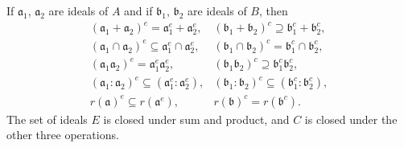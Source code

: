 \documentclass[class=book, crop=false]{standalone}
\theoremstyle{definition}
\theoremstyle{remark}
\begin{document}
\begin{exercise}\label{exc:1.18}
  If $\mathfrak{a}_{1}$, $\mathfrak{a}_{2}$ are ideals of $A$ and if
  $\mathfrak{b}_{1}$, $\mathfrak{b}_{2}$ are ideals of $B$, then
  \[
    \begin{array}{ll}
      \left(\mathfrak{a}_{1}+\mathfrak{a}_{2}\right)^{e}=\mathfrak{a}_{1}^{e}+\mathfrak{a}_{2}^{e}, & \left(\mathfrak{b}_{1}+\mathfrak{b}_{2}\right)^{c} \supseteq \mathfrak{b}_{1}^{c}+\mathfrak{b}_{2}^{c}, \\
      \left(\mathfrak{a}_{1} \cap \mathfrak{a}_{2}\right)^{e} \subseteq \mathfrak{a}_{1}^{e} \cap \mathfrak{a}_{2}^{e}, & \left(\mathfrak{b}_{1} \cap \mathfrak{b}_{2}\right)^{c}=\mathfrak{b}_{1}^{c} \cap \mathfrak{b}_{2}^{c}, \\
      \left(\mathfrak{a}_{1} \mathfrak{a}_{2}\right)^{e}=\mathfrak{a}_{1}^{e} \mathfrak{a}_{2}^{e}, & \left(\mathfrak{b}_{1} \mathfrak{b}_{2}\right)^{c} \supseteq \mathfrak{b}_{1}^{c} \mathfrak{b}_{2}^{c}, \\
      \left(\mathfrak{a}_{1}: \mathfrak{a}_{2}\right)^{e} \subseteq\left(\mathfrak{a}_{1}^{e}: \mathfrak{a}_{2}^{e}\right), & \left(\mathfrak{b}_{1}: \mathfrak{b}_{2}\right)^{c} \subseteq\left(\mathfrak{b}_{1}^{c}: \mathfrak{b}_{2}^{c}\right), \\
      r(\mathfrak{a})^{e} \subseteq r\left(\mathfrak{a}^{e}\right), & r(\mathfrak{b})^{c}=r\left(\mathfrak{b}^{c}\right).
    \end{array}
  \]
  The set of ideals $E$ is closed under sum and product, and $C$ is closed under
  the other three operations.
\end{exercise}
\end{document}
